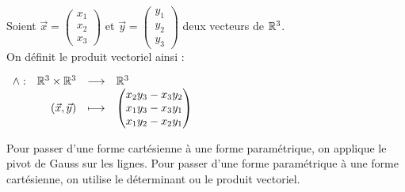 \begin{definition}
	Soient $\vec{x} = \begin{pmatrix} x_1 \\ x_2 \\ x_3 \end{pmatrix}$ et $\vec{y} = \begin{pmatrix} y_1 \\ y_2 \\ y_3 \end{pmatrix}$ deux vecteurs de $\mathbb{R}^3$.
	\\
	On définit le produit vectoriel ainsi :
	\begin{center}
		$
		\begin{array}{rrcl} \wedge : & \mathbb{R}^3 \times \mathbb{R}^3 & \longrightarrow & \mathbb{R}^3 \\ & (\vec{x}, \vec{y}) & \longmapsto & 
		\begin{pmatrix}
			x_2 y_3 - x_3 y_2 \\
			x_1 y_3 - x_3 y_1 \\
			x_1 y_2 - x_2 y_1
		\end{pmatrix}
		 \end{array}
		$
	\end{center}
\end{definition}

Pour passer d'une forme cartésienne à une forme paramétrique, on applique le pivot de Gauss sur les lignes.
Pour passer d'une forme paramétrique à une forme cartésienne, on utilise le déterminant ou le produit vectoriel.


